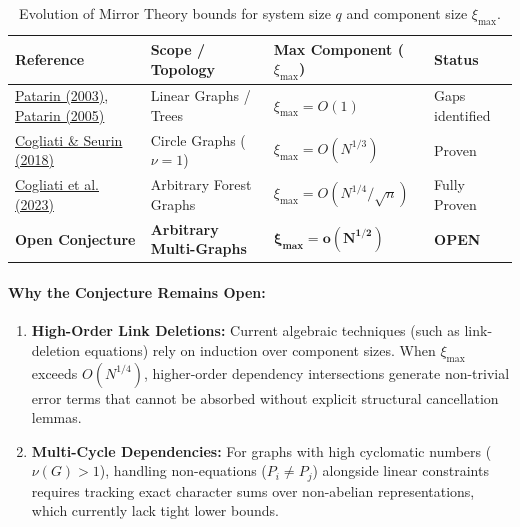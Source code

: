 \documentclass{aicr-conjecture}
\begin{document}
\begin{table}[h!]
\centering
\small
\begin{tabularx}{\textwidth}{@{}XXXl@{}}
\toprule
\textbf{Reference} & \textbf{Scope / Topology} & \textbf{Max Component ($\xi_{\max}$)} & \textbf{Status} \\ \midrule
\href{https://iacr.org/archive/crypto2003/27290510/27290510.pdf}{Patarin (2003)}, \href{https://doi.org/10.1007/11734727_25}{Patarin (2005)} & Linear Graphs / Trees & $\xi_{\max} = O(1)$ & Gaps identified \\
\href{https://yannickseurin.github.io/assets/papers/CogliatiS18_DCC.pdf}{Cogliati \& Seurin (2018)} & Circle Graphs ($\nu=1$) & $\xi_{\max} = O(N^{1/3})$ & Proven \\
\href{https://eprint.iacr.org/2022/686}{Cogliati et al. (2023)} & Arbitrary Forest Graphs & $\xi_{\max} = O(N^{1/4}/\sqrt{n})$ & Fully Proven \\
\textbf{Open Conjecture} & \textbf{Arbitrary Multi-Graphs} & $\mathbf{\xi_{\max} = o(N^{1/2})}$ & \textbf{OPEN} \\ \bottomrule
\end{tabularx}
\caption{Evolution of Mirror Theory bounds for system size $q$ and component size $\xi_{\max}$.}
\end{table}

\paragraph{Why the Conjecture Remains Open:}
\begin{enumerate}
    \item \textbf{High-Order Link Deletions:} Current algebraic techniques (such as link-deletion equations) rely on induction over component sizes. When $\xi_{\max}$ exceeds $O(N^{1/4})$, higher-order dependency intersections generate non-trivial error terms that cannot be absorbed without explicit structural cancellation lemmas.
    \item \textbf{Multi-Cycle Dependencies:} For graphs with high cyclomatic numbers ($\nu(G) > 1$), handling non-equations ($P_i \neq P_j$) alongside linear constraints requires tracking exact character sums over non-abelian representations, which currently lack tight lower bounds.
\end{enumerate}
\end{document}
